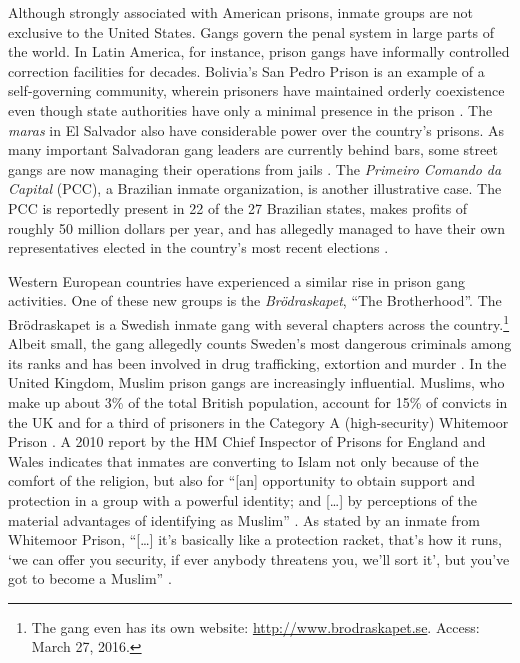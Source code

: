 \documentclass[a4paper, 12pt]{article}
\begin{document}
Although strongly associated with American prisons, inmate groups are not exclusive to the United States. Gangs govern the penal system in large parts of the world. In Latin America, for instance, prison gangs have informally controlled correction facilities for decades. Bolivia's San Pedro Prison is an example of a self-governing community, wherein prisoners have maintained orderly coexistence even though state authorities have only a minimal presence in the prison \citep{cerbini2012sanpedro,skarbek2010self}. The \textit{maras} in El Salvador also have considerable power over the country's prisons. As many important Salvadoran gang leaders are currently behind bars, some street gangs are now managing their operations from jails \citep{cruz2006maras,wolf2012mara}. The \textit{Primeiro Comando da Capital} (PCC), a Brazilian inmate organization, is another illustrative case. The PCC is reportedly present in 22 of the 27 Brazilian states, makes profits of roughly 50 million dollars per year, and has allegedly managed to have their own representatives elected in the country's most recent elections \citep{biondi2008etica,veja2013}. 

Western European countries have experienced a similar rise in prison gang activities. One of these new groups is the \textit{Brödraskapet}, ``The Brotherhood''. The Brödraskapet is a Swedish inmate gang with several chapters across the country.\footnote{The gang even has its own website: \href{http://www.brodraskapet.se}{http://www.brodraskapet.se}. Access: March 27, 2016.} Albeit small, the gang allegedly counts Sweden's most dangerous criminals among its ranks and has been involved in drug trafficking, extortion and murder \citep{larsson2011svensk}. In the United Kingdom, Muslim prison gangs are increasingly influential. Muslims, who make up about 3\% of the total British population, account for 15\% of convicts in the UK \citep{telegraph2014muslimgangs} and for a third of prisoners in the Category A (high-security) Whitemoor Prison \citep{BBC2010muslimgangs,guardian2008muslim}. A 2010 report by the HM Chief Inspector of Prisons for England and Wales indicates that inmates are converting to Islam not only because of the comfort of the religion, but also for ``[an] opportunity to obtain support and protection in a group with a powerful identity; and [\dots] by perceptions of the material advantages of identifying as Muslim'' \citep[p. 7]{hm2010muslim}. As stated by an inmate from Whitemoor Prison, ``[\dots] it's basically like a protection racket, that's how it runs, `we can offer you security, if ever anybody threatens you, we'll sort it', but you've got to become a Muslim'' \citep[p. 69]{liebling2011exploration}. 
\end{document}
